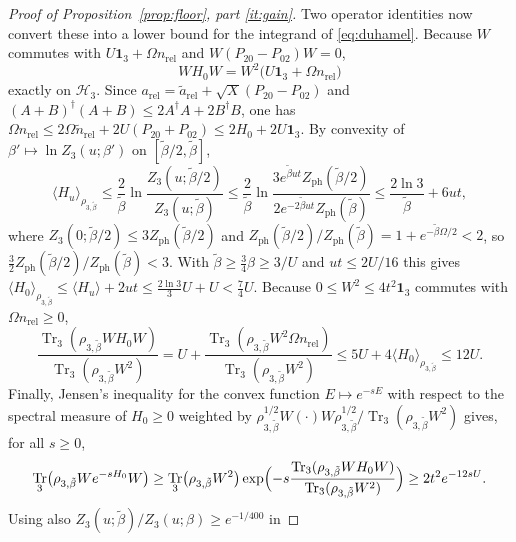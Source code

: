 \documentclass[11pt]{article}
\theoremstyle{plain}
\theoremstyle{definition}
\DeclareMathOperator{\Tr}{Tr}
\begin{document}
\begin{proof}[Proof of Proposition~\ref{prop:floor}, part \ref{it:gain}]
Two operator identities now convert these into a lower bound for the integrand of
\eqref{eq:duhamel}. Because $W$ commutes with $U\mathbf 1_3+\Omega n_{\mathrm{rel}}$
and $W(P_{20}-P_{02})W=0$,
\begin{equation}\label{eq:WH0W}
WH_0W=W^{2}\bigl(U\mathbf 1_3+\Omega n_{\mathrm{rel}}\bigr)
\end{equation}
exactly on $\mathcal H_3$. Since
$a_{\mathrm{rel}}=\tilde a_{\mathrm{rel}}+\sqrt X(P_{20}-P_{02})$ and
$(A+B)^\dagger(A+B)\le2A^\dagger A+2B^\dagger B$, one has
$\Omega n_{\mathrm{rel}}\le2\Omega\tilde n_{\mathrm{rel}}+2U(P_{20}+P_{02})\le2H_0+2U\mathbf 1_3$.
By convexity of $\beta'\mapsto\ln Z_3(u;\beta')$ on $[\tilde\beta/2,\tilde\beta]$,
\begin{equation}\label{eq:meanH}
\langle H_u\rangle_{\rho_{3,\tilde\beta}}\le\frac2{\tilde\beta}
\ln\frac{Z_3(u;\tilde\beta/2)}{Z_3(u;\tilde\beta)}
\le\frac2{\tilde\beta}\ln\frac{3e^{\tilde\beta ut}Z_{\mathrm{ph}}(\tilde\beta/2)}{2e^{-2\tilde\beta ut}Z_{\mathrm{ph}}(\tilde\beta)}
\le\frac{2\ln3}{\tilde\beta}+6ut ,
\end{equation}
where $Z_3(0;\tilde\beta/2)\le3Z_{\mathrm{ph}}(\tilde\beta/2)$ and
$Z_{\mathrm{ph}}(\tilde\beta/2)/Z_{\mathrm{ph}}(\tilde\beta)=1+e^{-\tilde\beta\Omega/2}<2$,
so $\frac32Z_{\mathrm{ph}}(\tilde\beta/2)/Z_{\mathrm{ph}}(\tilde\beta)<3$. With
$\tilde\beta\ge\frac34\beta\ge3/U$ and $ut\le2U/16$ this gives
$\langle H_0\rangle_{\rho_{3,\tilde\beta}}\le\langle H_u\rangle+2ut\le\frac{2\ln3}{3}U+U<\frac74U$.
Because $0\le W^{2}\le4t^{2}\mathbf 1_3$ commutes with $\Omega n_{\mathrm{rel}}\ge0$,
\begin{equation}\label{eq:WH0W2}
\frac{\Tr_3(\rho_{3,\tilde\beta}WH_0W)}{\Tr_3(\rho_{3,\tilde\beta}W^{2})}
=U+\frac{\Tr_3(\rho_{3,\tilde\beta}W^{2}\Omega n_{\mathrm{rel}})}{\Tr_3(\rho_{3,\tilde\beta}W^{2})}
\le5U+4\langle H_0\rangle_{\rho_{3,\tilde\beta}}\le12U .
\end{equation}
Finally, Jensen's inequality for the convex function $E\mapsto e^{-sE}$ with
respect to the spectral measure of $H_0\ge0$ weighted by
$\rho_{3,\tilde\beta}^{1/2}W(\cdot)W\rho_{3,\tilde\beta}^{1/2}/\Tr_3(\rho_{3,\tilde\beta}W^{2})$
gives, for all $s\ge0$,
\begin{equation}\label{eq:jensen}
\Tr_3\bigl(\rho_{3,\tilde\beta}We^{-sH_0}W\bigr)\ge\Tr_3\bigl(\rho_{3,\tilde\beta}W^{2}\bigr)
\exp\Bigl(-s\frac{\Tr_3(\rho_{3,\tilde\beta}WH_0W)}{\Tr_3(\rho_{3,\tilde\beta}W^{2})}\Bigr)\ge2t^{2}e^{-12sU} .
\end{equation}
Using also $Z_3(u;\tilde\beta)/Z_3(u;\beta)\ge e^{-1/400}$ in

\end{proof}
\end{document}
